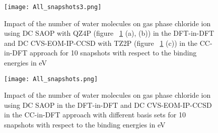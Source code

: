 \documentclass[a4paper,11pt]{report}
\begin{document}
\begin{figure}[H]\large
\captionsetup{font=footnotesize}
\texttt{[image: All\_snapshots3.png]}
\caption{Impact of the number of water molecules on gas phase chloride ion using DC SAOP with QZ4P (figure ~\ref{figure56} (a), (b)) in the DFT-in-DFT and DC CVS-EOM-IP-CCSD with TZ2P (figure ~\ref{figure56} (c)) in the CC-in-DFT approach for 10 snapshots with respect to the binding energies in eV}
\label{figure56}
\end{figure}

\begin{figure}[H]\large
\captionsetup{font=footnotesize}
\texttt{[image: All\_snapshots.png]}
\caption{Impact of the number of water molecules on gas phase chloride ion using DC SAOP in the DFT-in-DFT and DC CVS-EOM-IP-CCSD in the CC-in-DFT approach with different basis sets for 10 snapshots with respect to the binding energies in eV}
\label{figure55}
\end{figure}





\end{document}
